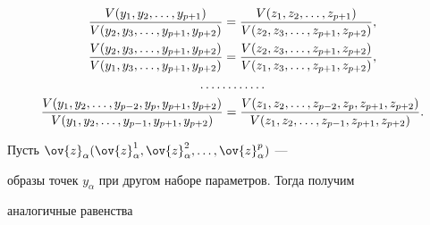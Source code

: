 \begin{gather}


\frac{V(y_{1}, y_{2}, \dotsc, y_{p+1})}{V(y_{2}, y_{3},


\dotsc, y_{p+1}, y_{p+2})}


=\frac{V(z_{1}, z_{2}, \dotsc, z_{p+1})}{V(z_{2}, z_{3},


\dotsc, z_{p+1}, z_{p+2})},\notag \\


%


\frac{V(y_{2}, y_{3}, \dotsc, y_{p+1}, y_{p+2})}{V(y_{1}, y_{3},


\dotsc, y_{p+1}, y_{p+2})}


=\frac{V(z_{2}, z_{3}, \dotsc, z_{p+1}, z_{p+2})}{V(z_{1}, z_{3},


\dotsc, z_{p+1}, z_{p+2})},\notag \\


\dotsc \dotsc \dotsc \dotsc \\


\frac{V(y_{1}, y_{2}, \dotsc, y_{p-2}, y_{p}, y_{p+1},


y_{p+2})}{V(y_{1}, y_{2}, \dotsc, y_{p-1}, y_{p+1}, y_{p+2})}


=\frac{V(z_{1}, z_{2}, \dotsc, z_{p-2}, z_{p}, z_{p+1}, z_{p+2})}


{V(z_{1}, z_{2}, \dotsc, z_{p-1}, z_{p+1}, z_{p+2})}.\notag


\end{gather}





Пусть $\ov{z}_{\alpha}(\ov{z}_{\alpha}^{1}, \ov{z}^{2}_{\alpha}, \dotsc,


\ov{z}^{p}_{\alpha})$ ---


образы точек $y_{\alpha}$ при другом наборе параметров. Тогда получим


аналогичные равенства


